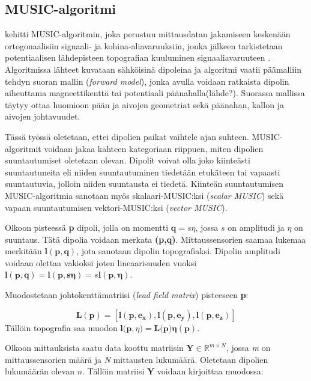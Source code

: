 \subsection{MUSIC-algoritmi}
\cite{Schmidt1986MultipleEstimation} kehitti MUSIC-algoritmin, joka perustuu mittausdatan jakamiseen keskenään ortogonaalisiin signaali- ja kohina-aliavaruuksiin, jonka jälkeen tarkistetaan potentiaalisen lähdepisteen topografian kuuluminen signaaliavaruuteen \citep{Mosher1999SourceMUSIC}. Algoritmissa lähteet kuvataan sähköisinä dipoleina ja algoritmi vaatii päämalliin tehdyn suoran mallin (\textit{forward model}), jonka avulla voidaan ratkaista dipolin aiheuttama magneettikenttä tai potentiaali päänahalla(lähde?). Suorassa mallissa täytyy ottaa huomioon pään ja aivojen geometriat sekä päänahan, kallon ja aivojen johtavuudet. \citep{hansen2010meg}

Tässä työssä oletetaan, ettei dipolien paikat vaihtele ajan suhteen. MUSIC-algoritmit voidaan jakaa kahteen kategoriaan riippuen, miten dipolien suuntautumiset oletetaan olevan. Dipolit voivat olla joko kiinteästi suuntautuneita eli niiden suuntautuminen tiedetään etukäteen tai vapaasti suuntautuvia, jolloin niiden suuntausta ei tiedetä. Kiinteän suuntautumisen MUSIC-algoritmia sanotaan myös skalaari-MUSIC:ksi (\textit{scalar MUSIC}) sekä vapaan suuntautumisen vektori-MUSIC:ksi (\textit{vector MUSIC}). \citep{Makela2018TruncatedLocalization}

Olkoon pisteessä \textbf{p} dipoli, jolla on momentti $\mathbf{q} = s\eta$, jossa $s$ on amplitudi ja $\eta$ on suuntaus. Tätä dipolia voidaan merkata \textbf{(p,q)}. Mittaussensorien saamaa lukemaa merkitään $\mathbf{l(p,q)}$, jota sanotaan dipolin topografiaksi. Dipolin amplitudi voidaan olettaa vakioksi joten lineaarisuuden vuoksi $\mathbf{l(p,q)} = \mathbf{l(p,s\eta)} = s\mathbf{l(p,\eta)}$.

Muodostetaan johtokenttämatriisi (\textit{lead field matrix}) pisteeseen \textbf{p}:

\begin{equation}
    \mathbf{L(p) = [l(p,e_x),l(p,e_y),l(p,e_z)]}
\end{equation}
Tällöin topografia saa muodon $\mathbf{l(p},\eta)=\mathbf{L(p})\mathbf{\eta}(\mathbf{p})$.

Olkoon mittauksista saatu data koottu matriisin $\mathbf{Y}\in \mathbb{R}^{m\times N}$, jossa \textit{m} on mittaussensorien määrä ja \textit{N} mittausten lukumäärä. Oletetaan dipolien lukumäärän olevan $n$. Tällöin matriisi $\mathbf{Y}$ voidaan kirjoittaa muodossa:

